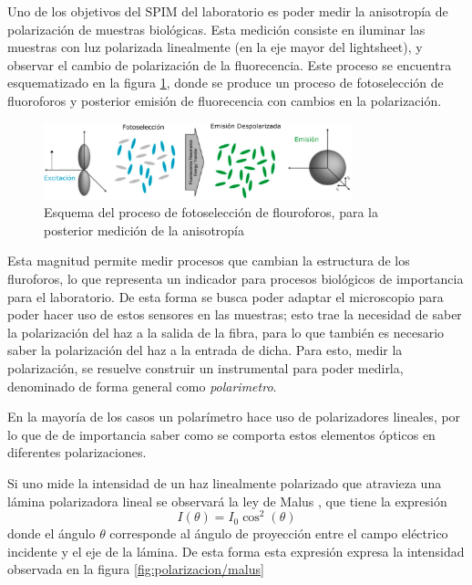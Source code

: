 Uno de los objetivos del SPIM del laboratorio es poder medir la anisotropía de polarización de muestras biológicas. Esta medición consiste en iluminar las muestras con luz polarizada linealmente (en la eje mayor del lightsheet), y observar el cambio de polarización de la fluorecencia. Este proceso se encuentra esquematizado en la figura \ref{fig:fotoseleccion}, donde se produce un proceso de fotoselección de fluoroforos y posterior emisión de fluorecencia con cambios en la polarización.

\begin{figure}[H]
    \centering
    \includegraphics[width=0.8\textwidth]{fig/fotoseleccion}
    \caption{Esquema del proceso de fotoselección de flouroforos, para la posterior medición de la anisotropía}
    \label{fig:fotoseleccion}
\end{figure}

Esta magnitud permite medir procesos que cambian la estructura de los fluroforos, lo que representa un indicador para procesos biológicos de importancia para el laboratorio. De esta forma se busca poder adaptar el microscopio para poder hacer uso de estos sensores en las muestras; esto trae la necesidad de saber la polarización del haz a la salida de la fibra, para lo que también es necesario saber la polarización del haz a la entrada de dicha. Para esto, medir la polarización, se resuelve construir un instrumental para poder medirla, denominado de forma general como \emph{polarimetro}.

En la mayoría de los casos un polarímetro hace uso de polarizadores lineales, por lo que de de importancia saber como se comporta estos elementos ópticos en diferentes polarizaciones.

Si uno mide la intensidad de un haz linealmente polarizado que atravieza una lámina polarizadora lineal se observará la ley de Malus \cite{goldstein_collete}, que tiene la expresión
\begin{equation}
    I(\theta) = I_0 \cos^2(\theta)
    \label{eq:malus}
\end{equation}
donde el ángulo $\theta$ corresponde al ángulo de proyección entre el campo eléctrico incidente y el eje de la lámina. De esta forma esta expresión expresa la intensidad observada en la figura \ref{fig:polarizacion/malus}

